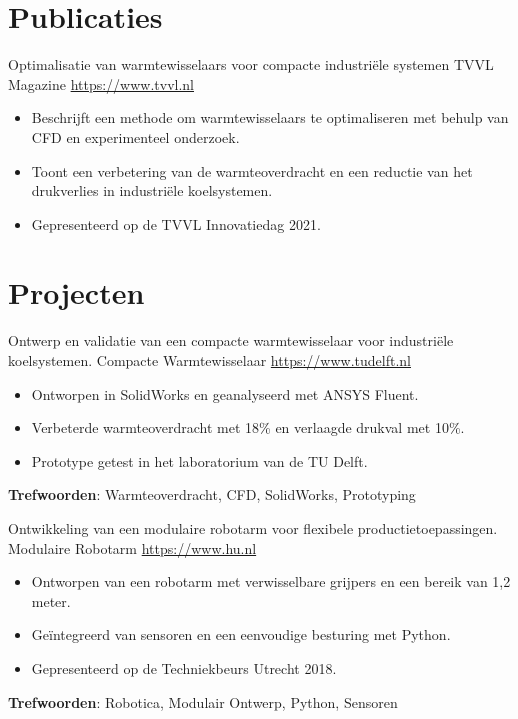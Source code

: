 \documentclass[a4paper, serif, 10pt]{moderncv}
\begin{document}
\section{Publicaties}

        {Optimalisatie van warmtewisselaars voor compacte industriële systemen}
        {TVVL Magazine}
        {\url{https://www.tvvl.nl}}
        {}
        {\begin{itemize}
\item Beschrijft een methode om warmtewisselaars te optimaliseren met behulp van CFD en experimenteel onderzoek.
\item Toont een verbetering van de warmteoverdracht en een reductie van het drukverlies in industriële koelsystemen.
\item Gepresenteerd op de TVVL Innovatiedag 2021.
\end{itemize}}
\section{Projecten}

        {Ontwerp en validatie van een compacte warmtewisselaar voor industriële koelsystemen.}
        {Compacte Warmtewisselaar}
        {\url{https://www.tudelft.nl}}
        {}
        {\begin{itemize}
\item Ontworpen in SolidWorks en geanalyseerd met ANSYS Fluent.
\item Verbeterde warmteoverdracht met 18\% en verlaagde drukval met 10\%.
\item Prototype getest in het laboratorium van de TU Delft.
\end{itemize}
\textbf{Trefwoorden}: Warmteoverdracht, CFD, SolidWorks, Prototyping}

        {Ontwikkeling van een modulaire robotarm voor flexibele productietoepassingen.}
        {Modulaire Robotarm}
        {\url{https://www.hu.nl}}
        {}
        {\begin{itemize}
\item Ontworpen van een robotarm met verwisselbare grijpers en een bereik van 1,2 meter.
\item Geïntegreerd van sensoren en een eenvoudige besturing met Python.
\item Gepresenteerd op de Techniekbeurs Utrecht 2018.
\end{itemize}
\textbf{Trefwoorden}: Robotica, Modulair Ontwerp, Python, Sensoren}
\end{document}
